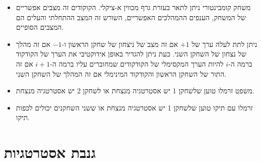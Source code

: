 \documentclass{tstextbook}
\begin{document}
\begin{summary}
  \begin{itemize}
    \item משחק קומבינטורי ניתן לתאר בעזרת גרף מכווין א-ציקלי. הקוקודים זה מצבים אפשריים של המשחק, הענפים ההמהלכים האפשריים, השורש זה המצב ההתחלתי והעלים הם המצבים הסופיים.
    \item ניתן לתת לעלה ערך של \(+1\) אם זה מצב של ניצחון של שחקן הראשון ו-\(-1\) אם זה מהלך של נצחון של השחקן השני. כעת ניתן להגדיר באופן אידוקטיבי את הערך של הקודקוד ברמה ה-\(i\) להיות הערך המקסימלי של הקודקודים שמחוברים עליו ברמה ה-\(i+1\) אם זה התור של השחקן הראשון והקודקוד המינימלי אם זה המהלך של השחקן השני.
    \item משפט זרמלו טוען שלשחקן 1 יש אסטרטגיה מנצחת או לשחקן 2 יש אסטרטגיה מנצחת.
    \item זרמלו עם תיקו טוען שלשחקן 1 יש אסטרטגיה מנצחת או ששני השחקנים יכולים לכפות תיקו.
  \end{itemize}
\end{summary}
\section{גנבת אסטרטגיות}
\end{document}
